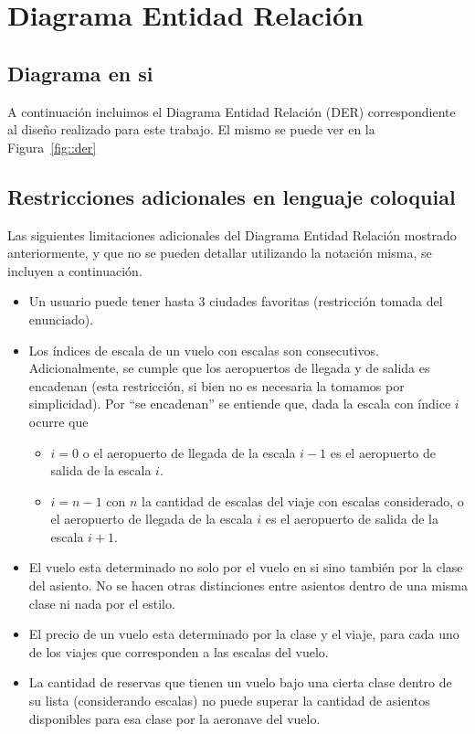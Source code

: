 \section{Diagrama Entidad Relaci\'on}

\subsection{Diagrama en si}

A continuaci\'on incluimos el Diagrama Entidad Relaci\'on (DER) correspondiente
al dise\~no realizado para este trabajo. El mismo se puede ver en la Figura~\ref{fig::der}

\subsection{Restricciones adicionales en lenguaje coloquial}

Las siguientes limitaciones adicionales del Diagrama Entidad Relaci\'on mostrado anteriormente,
y que no se pueden detallar utilizando la notaci\'on misma, se incluyen a continuaci\'on.

\begin{itemize}
	\item Un usuario puede tener hasta 3 ciudades favoritas (restricci\'on tomada del enunciado).
	\item Los \'indices de escala de un vuelo con escalas son consecutivos. Adicionalmente, se cumple
	que los aeropuertos de llegada y de salida es encadenan (esta restricci\'on, si bien no es necesaria
	la tomamos por simplicidad). Por ``se encadenan'' se entiende que, dada la escala con \'indice $i$
	ocurre que
	
	\begin{itemize}
		\item $i = 0$ o el aeropuerto de llegada de la escala $i-1$ es el aeropuerto de salida de
		la escala $i$.
		\item $i = n-1$ con $n$ la cantidad de escalas del viaje con escalas considerado, o el aeropuerto
		de llegada de la escala $i$ es el aeropuerto de salida de la escala $i+1$.
	\end{itemize}
	
	\item El vuelo esta determinado no solo por el vuelo en si sino tambi\'en por la clase del asiento. No se
	hacen otras distinciones entre asientos dentro de una misma clase ni nada por el estilo.
	\item El precio de un vuelo esta determinado por la clase y el viaje, para cada uno de los viajes que corresponden
	a las escalas del vuelo.
	\item La cantidad de reservas que tienen un vuelo bajo una cierta clase dentro de su lista (considerando escalas)
	no puede superar la cantidad de asientos disponibles para esa clase por la aeronave del vuelo.
\end{itemize}

